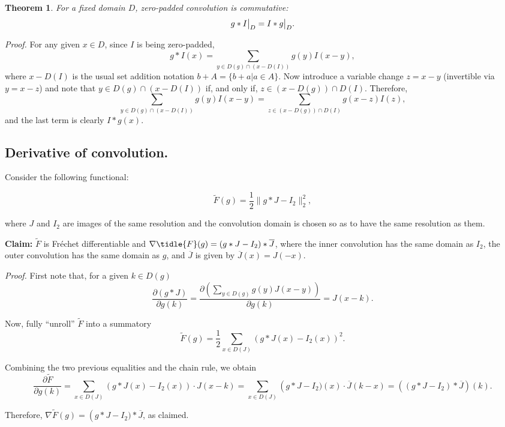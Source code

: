 \documentclass{article}
\newtheorem{theorem}{Theorem}
\newcommand\restr[2]{{%
  \left.\kern-\nulldelimiterspace %
  #1 %
  \vphantom{\big|} %
  \right|_{#2} %
  }}
\begin{document}
\begin{theorem}
  For a fixed domain \(D\), zero-padded convolution is commutative:
  \[
    \restr{g\ast I}{D} = \restr{I\ast g}{D}
  .\]
\end{theorem}
\textit{Proof.} For any given \(x\in D\), since \(I\) is being zero-padded,
\[
  g\ast I(x) = \sum_{y\in D(g)\cap\left(x - D(I)\right)}g(y)I(x-y),
\]
where \(x-D(I)\) is the usual set addition notation \(b+A = \{b + a | a\in A\}\). Now introduce a variable change \(z = x-y\) (invertible via \(y=x-z\)) and note that \(y\in D(g)\cap (x-D(I))\) if, and only if, \(z\in(x-D(g))\cap D(I)\). Therefore,
\[
  \sum_{y\in D(g)\cap\left(x - D(I)\right)}g(y)I(x-y) = \sum_{z\in (x-D(g))\cap D(I)}g(x-z)I(z)
,\]
and the last term is clearly \(I\ast g(x)\).~\qedsymbol

\subsection{Derivative of convolution.}

Consider the following functional:

\[
  \tilde{F}(g) = \frac12\|g\ast J - I_2\|_2^2
,\]

where \(J\) and \(I_2\) are images of the same resolution and the convolution domain is chosen so as to have the same resolution as them.

\textbf{Claim:} \(\tilde{F}\) is Fréchet differentiable and \(\nabla{\tidle{F}}(g) = \left(g\ast J - I_2\right)\ast \overline{J}\), where the inner convolution has the same domain as \(I_2\), the outer convolution has the same domain as \(g\), and \(\overline{J}\) is given by \(\overline{J}(x)=J(-x)\).

\textit{Proof.} First note that, for a given \(k\in D(g)\)
\[
\frac{\partial (g\ast J)}{\partial g(k)}=\frac{\partial\left(\sum_{y\in D(g)}g(y)J(x-y)\right)}{\partial g(k)} = J(x-k)
.\]

Now, fully ``unroll'' \(\tilde{F}\) into a summatory
\[
  \tilde{F}(g) = \frac12 \sum_{x\in D(J)}\left(g\ast J(x) - I_2(x)\right)^2
.\]

Combining the two previous equalities and the chain rule, we obtain
\[
  \frac{\partial\tilde{F}}{\partial g(k)} = \sum_{x\in D(J)} \left(g\ast J(x) - I_2(x)\right)\cdot J(x-k) = \sum_{x\in D(J)}\left(g\ast J - I_2)(x)\cdot\overline{J}(k-x)=\left(\left(g\ast J - I_2\right)\ast\overline{J}
\right)(k).\]

Therefore, \(\nabla\tilde{F}(g)=\left(g\ast J - I_2)\ast\overline{J}\), as claimed. \qedsymbol
\end{document}
